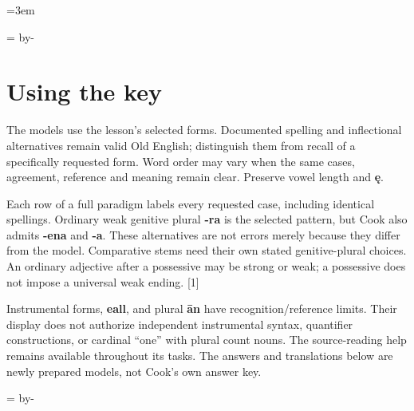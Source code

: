 \newcommand{\runningtitle}{Unit 3. Answer key}

\emergencystretch=3em
\newcommand{\itempara}[2]{\par\addvspace{3pt}\noindent\hangindent=1.8em\hangafter=1\makebox[1.8em][l]{#1.}#2\par}
\newcommand{\reserve}[1]{\par\begingroup\dimen0=\pagegoal\advance\dimen0 by-\pagetotal\ifdim\dimen0<#1\newpage\fi\endgroup}

\raggedright
{}

\reserve{7\baselineskip}
\section*{Using the key}

The models use the lesson’s selected forms. Documented spelling and inflectional alternatives remain valid Old English; distinguish them from recall of a specifically requested form. Word order may vary when the same cases, agreement, reference and meaning remain clear. Preserve vowel length and \textbf{ę}.

Each row of a full paradigm labels every requested case, including identical spellings. Ordinary weak genitive plural \textbf{-ra} is the selected pattern, but Cook also admits \textbf{-ena} and \textbf{-a}. These alternatives are not errors merely because they differ from the model. Comparative stems need their own stated genitive-plural choices. An ordinary adjective after a possessive may be strong or weak; a possessive does not impose a universal weak ending. [1]

Instrumental forms, \textbf{eall}, and plural \textbf{ān} have recognition/\allowbreak{}reference limits. Their display does not authorize independent instrumental syntax, quantifier constructions, or cardinal “one” with plural count nouns. The source-reading help remains available throughout its tasks. The answers and translations below are newly prepared models, not Cook’s own answer key.

\reserve{7\baselineskip}
